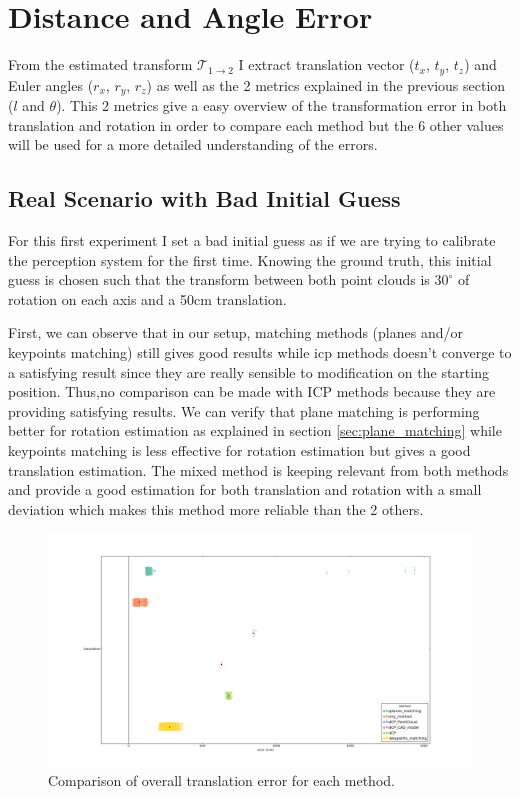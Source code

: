 \section{Distance and Angle Error}

From the estimated transform $\mathcal{T}_{1\longrightarrow2}$ I extract translation vector ($t_x$, $t_y$, $t_z$) and Euler angles ($r_x$, $r_y$, $r_z$) as well as the 2 metrics explained in the previous section ($l$ and $\theta$). This 2 metrics give a easy overview of the transformation error in both translation and rotation in order to compare each method but the 6 other values will be used for a more detailed understanding of the errors.

\subsection{Real Scenario with Bad Initial Guess}

For this first experiment I set a bad initial guess as if we are trying to calibrate the perception system for the first time. Knowing the ground truth, this initial guess is chosen such that the transform between both point clouds is $30^\circ$ of rotation on each axis and a 50cm translation.

First, we can observe that in our setup, matching methods (planes and/or keypoints matching) still gives good results while \acrshort{icp} methods doesn't converge to a satisfying result since they are really sensible to modification on the starting position. Thus,no comparison can be made with ICP methods because they are providing satisfying results.
We can verify that plane matching is performing better for rotation estimation as explained in section \ref{sec:plane_matching} while keypoints matching is less effective for rotation estimation but gives a good translation estimation. The mixed method is keeping relevant from both methods and provide a good estimation for both translation and rotation with a small deviation which makes this method more reliable than the 2 others. 

\begin{figure}[h]
    \centering
    \includegraphics[width=\textwidth]{images/transl_comp.png}
    \caption{Comparison of overall translation error for each method.}
    \label{fig:trans_comp}
\end{figure}

